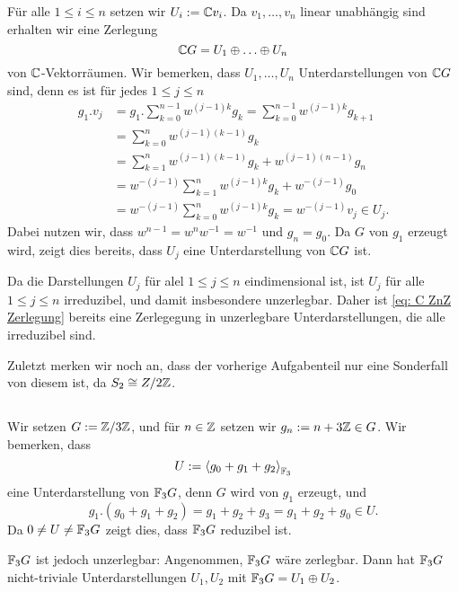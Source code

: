 \documentclass[a4paper,10pt]{article}
\begin{document}
Für alle $1 \leq i \leq n$ setzen wir $U_i := \mathbb{C} v_i$. Da $v_1, \ldots, v_n$ linear unabhängig sind erhalten wir eine Zerlegung
\begin{equation}\label{eq: C ZnZ Zerlegung}
 \mathbb{C} G = U_1 \oplus \ldots \oplus U_n
\end{equation}
von $\mathbb{C}$-Vektorräumen. Wir bemerken, dass $U_1, \ldots, U_n$ Unterdarstellungen von $\mathbb{C} G$ sind, denn es ist für jedes $1 \leq j \leq n$
\begin{align*}
 g_1 . v_j
 &= g_1 . \sum_{k=0}^{n-1} w^{(j-1)k} g_k
 = \sum_{k=0}^{n-1} w^{(j-1)k} g_{k+1} \\
 &= \sum_{k=0}^n w^{(j-1)(k-1)} g_k \\
 &= \sum_{k=1}^n w^{(j-1)(k-1)} g_k + w^{(j-1)(n-1)} g_n \\
 &= w^{-(j-1)} \sum_{k=1}^n w^{(j-1)k} g_k + w^{-(j-1)} g_0 \\
 &= w^{-(j-1)} \sum_{k=0}^n w^{(j-1)k} g_k
 = w^{-(j-1)} v_j
 \in U_j.
\end{align*}
Dabei nutzen wir, dass $w^{n-1} = w^n w^{-1} = w^{-1}$ und $g_n = g_0$. Da $G$ von $g_1$ erzeugt wird, zeigt dies bereits, dass $U_j$ eine Unterdarstellung von $\mathbb{C} G$ ist.

Da die Darstellungen $U_j$ für alel $1 \leq j \leq n$ eindimensional ist, ist $U_j$ für alle $1 \leq j \leq n$ irreduzibel, und damit insbesondere unzerlegbar. Daher ist \eqref{eq: C ZnZ Zerlegung} bereits eine Zerlegegung in unzerlegbare Unterdarstellungen, die alle irreduzibel sind.

Zuletzt merken wir noch an, dass der vorherige Aufgabenteil nur eine Sonderfall von diesem ist, da $S_2 \cong Z/2\mathbb{Z}$.


\subsection{}
Wir setzen $G := \mathbb{Z}/3\mathbb{Z}$, und für $n \in \mathbb{Z}$ setzen wir $g_n := n+3\mathbb{Z} \in G$. Wir bemerken, dass
\[
 U := \left\langle g_0 + g_1 + g_2 \right\rangle_{\mathbb{F}_3}
\]
eine Unterdarstellung von $\mathbb{F}_3 G$, denn $G$ wird von $g_1$ erzeugt, und
\[
 g_1.(g_0 + g_1 + g_2)
 = g_1 + g_2 + g_3
 = g_1 + g_2 + g_0
 \in U.
\]
Da $0 \neq U \neq \mathbb{F}_3 G$ zeigt dies, dass $\mathbb{F}_3 G$ reduzibel ist.

$\mathbb{F}_3 G$ ist jedoch unzerlegbar: Angenommen, $\mathbb{F}_3 G$ wäre zerlegbar. Dann hat $\mathbb{F}_3 G$ nicht-triviale Unterdarstellungen $U_1, U_2$ mit $\mathbb{F}_3 G = U_1 \oplus U_2$.
\end{document}
